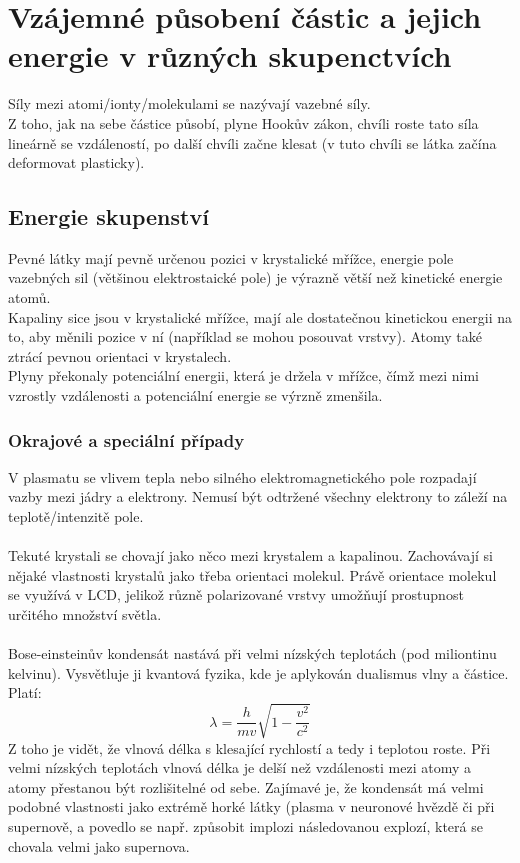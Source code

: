 \documentclass[titlepage]{book}
\begin{document}
\section{Vzájemné působení částic a jejich energie v různých skupenctvích}
Síly mezi atomi/ionty/molekulami se nazývají vazebné síly.\\
Z toho, jak na sebe částice působí, plyne Hookův zákon, chvíli roste tato síla lineárně se vzdáleností, po další chvíli začne klesat (v tuto chvíli se látka začína deformovat plasticky).\\
\subsection{Energie skupenství}
Pevné látky mají pevně určenou pozici v krystalické mřížce, energie pole vazebných sil (většinou elektrostaické pole) je výrazně větší než kinetické energie atomů.\\
Kapaliny sice jsou v krystalické mřížce, mají ale dostatečnou kinetickou energii na to, aby měnili pozice v ní (například se mohou posouvat vrstvy). Atomy také ztrácí pevnou orientaci v krystalech.\\
Plyny překonaly potenciální energii, která je držela v mřížce, čímž mezi nimi vzrostly vzdálenosti a potenciální energie se výrzně zmenšila.
\subsubsection{Okrajové a speciální případy}
V plasmatu se vlivem tepla nebo silného elektromagnetického pole rozpadají vazby mezi jádry a elektrony. Nemusí být odtržené všechny elektrony to záleží na teplotě/intenzitě pole.
\paragraph{}
Tekuté krystali se chovají jako něco mezi krystalem a kapalinou. Zachovávají si nějaké vlastnosti krystalů jako třeba orientaci molekul. Právě orientace molekul se využívá v LCD, jelikož různě polarizované vrstvy umožňují prostupnost určitého množství světla.
\paragraph{}
Bose-einsteinův kondensát nastává při velmi nízských teplotách (pod miliontinu kelvinu). Vysvětluje ji kvantová fyzika, kde je aplykován dualismus vlny a částice. Platí:\\
\begin{equation}
\lambda = \frac{h}{mv}\sqrt{1 - \frac{v^2}{c^2}}
\end{equation}
Z toho je vidět, že vlnová délka s klesající rychlostí a tedy i teplotou roste. Při velmi nízských teplotách vlnová délka je delší než vzdálenosti mezi atomy a atomy přestanou být rozlišitelné od sebe. Zajímavé je, že kondensát má velmi podobné vlastnosti jako extrémě horké látky (plasma v neuronové hvězdě či při supernově, a povedlo se např. způsobit implozi následovanou explozí, která se chovala velmi jako supernova.
\end{document}
